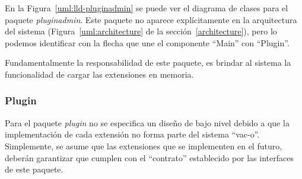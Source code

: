   En la Figura~\ref{uml:lld-pluginadmin} se puede ver el diagrama de clases
para el paquete \textit{pluginadmin}. Este paquete no aparece expl\'icitamente
en la arquitectura del sistema (Figura~\ref{uml:architecture} de la
secci\'on~\ref{architecture}), pero lo podemos identificar con la flecha que une
el componente ``Main'' con ``Plugin''.

  Fundamentalmente la responsabilidad de este paquete, es brindar al sistema la
funcionalidad de cargar las extensiones en memoria.

  \subsubsection{Plugin}
  Para el paquete \textit{plugin} no se especifica un dise\~no de bajo nivel
debido a que la implementaci\'on de cada extensi\'on no forma parte del sistema
``vac-o''. Simplemente, se asume que las extensiones que se implementen en el
futuro, deber\'an garantizar que cumplen con el ``contrato'' establecido por
las interfaces de este paquete.
